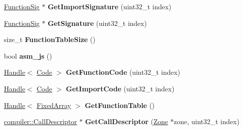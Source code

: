 \begin{DoxyCompactItemize}
\item 
\hyperlink{classv8_1_1internal_1_1_signature}{Function\+Sig} $\ast$ {\bfseries Get\+Import\+Signature} (uint32\+\_\+t index)\hypertarget{structv8_1_1internal_1_1wasm_1_1_module_env_aad507762d8bf6fd4f7b2752bd1015972}{}\label{structv8_1_1internal_1_1wasm_1_1_module_env_aad507762d8bf6fd4f7b2752bd1015972}

\item 
\hyperlink{classv8_1_1internal_1_1_signature}{Function\+Sig} $\ast$ {\bfseries Get\+Signature} (uint32\+\_\+t index)\hypertarget{structv8_1_1internal_1_1wasm_1_1_module_env_af09378829c0aa987dc8920606c6238f7}{}\label{structv8_1_1internal_1_1wasm_1_1_module_env_af09378829c0aa987dc8920606c6238f7}

\item 
size\+\_\+t {\bfseries Function\+Table\+Size} ()\hypertarget{structv8_1_1internal_1_1wasm_1_1_module_env_ab3447c0ba3b20a5f7945d2e8ba119ffc}{}\label{structv8_1_1internal_1_1wasm_1_1_module_env_ab3447c0ba3b20a5f7945d2e8ba119ffc}

\item 
bool {\bfseries asm\+\_\+js} ()\hypertarget{structv8_1_1internal_1_1wasm_1_1_module_env_a7b359c0b00aa0341a01fdc65c43345ab}{}\label{structv8_1_1internal_1_1wasm_1_1_module_env_a7b359c0b00aa0341a01fdc65c43345ab}

\item 
\hyperlink{classv8_1_1internal_1_1_handle}{Handle}$<$ \hyperlink{classv8_1_1internal_1_1_code}{Code} $>$ {\bfseries Get\+Function\+Code} (uint32\+\_\+t index)\hypertarget{structv8_1_1internal_1_1wasm_1_1_module_env_a99dfa74dc327980f496ac8245fbf179d}{}\label{structv8_1_1internal_1_1wasm_1_1_module_env_a99dfa74dc327980f496ac8245fbf179d}

\item 
\hyperlink{classv8_1_1internal_1_1_handle}{Handle}$<$ \hyperlink{classv8_1_1internal_1_1_code}{Code} $>$ {\bfseries Get\+Import\+Code} (uint32\+\_\+t index)\hypertarget{structv8_1_1internal_1_1wasm_1_1_module_env_a6135db3cbfd9256b266e88a5d0822e9e}{}\label{structv8_1_1internal_1_1wasm_1_1_module_env_a6135db3cbfd9256b266e88a5d0822e9e}

\item 
\hyperlink{classv8_1_1internal_1_1_handle}{Handle}$<$ \hyperlink{classv8_1_1internal_1_1_fixed_array}{Fixed\+Array} $>$ {\bfseries Get\+Function\+Table} ()\hypertarget{structv8_1_1internal_1_1wasm_1_1_module_env_a7a2fec96f39ac07a85153b140c076530}{}\label{structv8_1_1internal_1_1wasm_1_1_module_env_a7a2fec96f39ac07a85153b140c076530}

\item 
\hyperlink{classv8_1_1internal_1_1compiler_1_1_call_descriptor}{compiler\+::\+Call\+Descriptor} $\ast$ {\bfseries Get\+Call\+Descriptor} (\hyperlink{classv8_1_1internal_1_1_zone}{Zone} $\ast$zone, uint32\+\_\+t index)\hypertarget{structv8_1_1internal_1_1wasm_1_1_module_env_ae85a8b9a5968863eb20a0881af3162af}{}\label{structv8_1_1internal_1_1wasm_1_1_module_env_ae85a8b9a5968863eb20a0881af3162af}

\end{DoxyCompactItemize}
